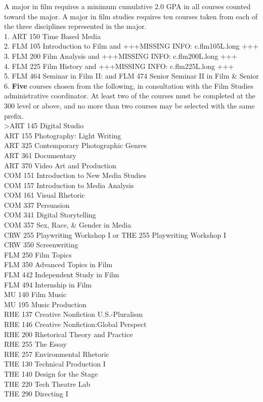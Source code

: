 \documentclass[
  letterpaper,
]{scrbook}
\begin{document}
A major in film requires a minimum cumulative 2.0 GPA in all courses
counted toward the major. A major in film studies requires ten courses
taken from each of the three disciplines represented in the major.\\
1. ART 150 Time Based Media\\
2. FLM 105 Introduction to Film and +++MISSING INFO: c.flm105L.long
+++\\
3. FLM 200 Film Analysis and +++MISSING INFO: c.flm200L.long +++\\
4. FLM 225 Film History and +++MISSING INFO: c.flm225L.long +++\\
5. FLM 464 Seminar in Film II: and FLM 474 Senior Seminar II in Film \&
Senior\\
6. \textbf{Five} courses chosen from the following, in consultation with
the Film Studies administrative coordinator. At least two of the courses
must be completed at the 300 level or above, and no more than two
courses may be selected with the same prefix.\\
\textgreater ART 145 Digital Studio\\
ART 155 Photography: Light Writing\\
ART 325 Contemporary Photographic Genres\\
ART 361 Documentary\\
ART 370 Video Art and Production\\
COM 151 Introduction to New Media Studies\\
COM 157 Introduction to Media Analysis\\
COM 161 Visual Rhetoric\\
COM 337 Persuasion\\
COM 341 Digital Storytelling\\
COM 357 Sex, Race, \& Gender in Media\\
CRW 255 Playwriting Workshop I or THE 255 Playwriting Workshop I\\
CRW 350 Screenwriting\\
FLM 250 Film Topics\\
FLM 350 Advanced Topics in Film\\
FLM 442 Independent Study in Film\\
FLM 494 Internship in Film\\
MU 140 Film Music\\
MU 195 Music Production\\
RHE 137 Creative Nonfiction U.S.-Pluralism\\
RHE 146 Creative Nonfiction:Global Perspect\\
RHE 200 Rhetorical Theory and Practice\\
RHE 255 The Essay\\
RHE 257 Environmental Rhetoric\\
THE 130 Technical Production I\\
THE 140 Design for the Stage\\
THE 220 Tech Theatre Lab\\
THE 290 Directing I
\end{document}

